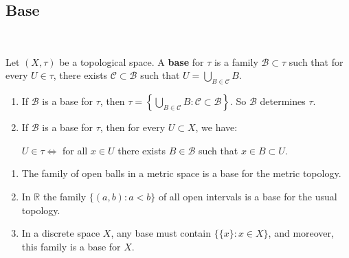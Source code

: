 \documentclass[a4paper]{article}
\begin{document}
\subsection{Base}\ \vspace{-1.5em}
\begin{definition}
    Let $(X, \tau)$ be a topological space. A \textbf{base} for $\tau$ is a family $\mathcal{B} \subset \tau$ such that for every $U \in \tau$, there exists $\mathcal{C} \subset \mathcal{B}$ such that $U=\bigcup_{B \in \mathcal{C}} B$.
\end{definition}
\begin{note}
    \begin{enumerate}
        \item If $\mathcal{B}$ is a base for $\tau$, then $\tau=\left\{\bigcup_{B \in \mathcal{C}} B: \mathcal{C} \subset \mathcal{B}\right\}$. So $\mathcal{B}$ determines $\tau$.
      
        \item If $\mathcal{B}$ is a base for $\tau$, then for every $U \subset X$, we have:
        
        \begin{center}
            $U \in \tau \Longleftrightarrow$ for all $x \in U$ there exists $B \in \mathcal{B}$ such that $x \in B \subset U$.
        \end{center}
      \end{enumerate}
\end{note}

\begin{example}
    \begin{enumerate}
        \item The family of open balls in a metric space is a base for the metric topology.
      
        \item In $\mathbb{R}$ the family $\{(a, b): a<b\}$ of all open intervals is a base for the usual topology.
      
        \item In a discrete space $X$, any base must contain $\{\{x\}: x \in X\}$, and moreover, this family is a base for $X$.
      \end{enumerate}
\end{example}
\end{document}
